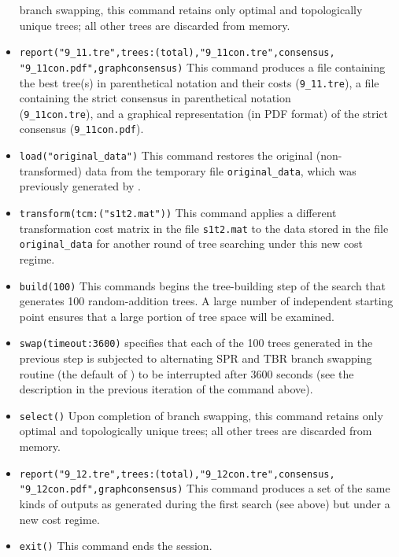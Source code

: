 \begin{itemize}
branch swapping, this command retains only optimal and topologically
unique trees; all other trees are discarded from memory.  
\item \texttt{report("9\_11.tre",trees:(total),"9\_11con.tre",consensus,\\"9\_11con.pdf",graphconsensus)}
This command produces a file containing the best tree(s) in
parenthetical notation and their costs (\texttt{9\_11.tre}), a file
containing the strict consensus in parenthetical notation
\\(\texttt{9\_11con.tre}), and a graphical representation (in PDF
format) of the strict consensus (\texttt{9\_11con.pdf}).  
\item \texttt{load("original\_data")} This command restores the original
(non-trans\-formed) data from the temporary file \texttt{original\_data},
which was previously generated by .  
\item \texttt{transform(tcm:("s1t2.mat"))} This command applies a different
transformation cost matrix in the file \texttt{s1t2.mat} to the
data stored in the file \texttt{original\_data} for another round
of tree searching under this new cost regime.  
\item \texttt{build(100)} This commands begins the tree-building step 
of the search that generates 100 random-addition trees. A large 
number of independent starting point ensures that a large portion 
of tree space will be examined.  
\item \texttt{swap(timeout:3600)}  specifies that each 
of the 100 trees generated in the previous step is subjected to 
alternating SPR and TBR branch swapping routine (the default of \poy) 
to be interrupted after 3600 seconds (see the description in the 
previous iteration of the command above).  
\item \texttt{select()} Upon completion of branch swapping,
this command retains only optimal and topologically unique trees;
all other trees are discarded from memory.  
\item \texttt{report("9\_12.tre",trees:(total),"9\_12con.tre",consensus,\\"9\_12con.pdf",graphconsensus)}
This command produces a set of the same kinds of outputs as generated
during the first search (see above) but under a new cost regime.
\item \texttt{exit()} This command ends the \poy session.  
\end{itemize}



